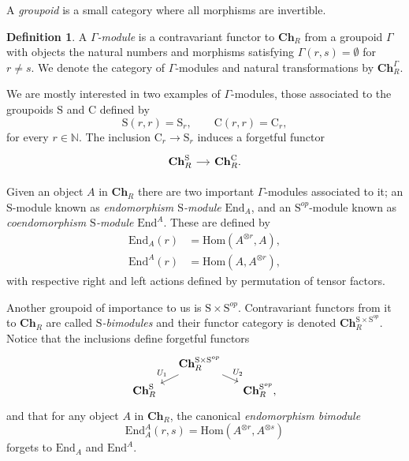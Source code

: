 \documentclass[A4]{amsart}
\theoremstyle{definition}
\newtheorem{definition}[theorem]{Definition}
\newcommand{\Hom}{\mathrm{Hom}}
\newcommand{\End}{\mathrm{End}}
\begin{document}
A \textit{groupoid} is a small category where all morphisms are invertible.
\begin{definition}
	A \textit{$\Gamma$-module} is a contravariant functor to $\mathbf{Ch}_R$ from a groupoid $\Gamma$ with objects the natural numbers and morphisms satisfying $\Gamma(r,s) = \emptyset$ for $r \neq s$. We denote the category of $\Gamma$-modules and natural transformations by $\mathbf{Ch}_R^\Gamma$.
\end{definition}

We are mostly interested in two examples of $\Gamma$-modules, those associated to the groupoids $\mathrm{S}$ and $\mathrm{C}$ defined by
\begin{equation*}
\mathrm{S}(r, r) = \mathrm{S}_r, \qquad
\mathrm{C}(r,r) = \mathrm{C}_r,
\end{equation*}
for every $r \in \mathbb{N}$. The inclusion $\mathrm{C}_r \to \mathrm{S}_r$ induces a forgetful functor
\begin{equation*}
\begin{tikzcd} [column sep = small]
\mathbf{Ch}_R^\mathrm{S}  \arrow[r] & \mathbf{Ch}_R^\mathrm{C}.
\end{tikzcd}
\end{equation*}

Given an object $A$ in $\mathbf{Ch}_R$ there are two important $\Gamma$-modules associated to it; an $\mathrm{S}$-module known as \textit{endomorphism $\mathrm{S}$-module} $\End_A$, and an $\mathrm{S}^{op}$-module known as \textit{coendomorphism $\mathrm{S}$-module} $\End^A$. These are defined by
\begin{align*}	
\End_A(r) &= \Hom(A^{\otimes r},A), \\
\End^A(r) &= \Hom(A,A^{\otimes r}),
\end{align*}
with respective right and left actions defined by permutation of tensor factors. 

Another groupoid of importance to us is $\mathrm{S} \times \mathrm{S}^{op}$. Contravariant functors from it to $\mathbf{Ch}_R$ are called \textit{$\mathrm{S}$-bimodules} and their functor category is denoted $\mathbf{Ch}_R^{\mathrm{S} \times \mathrm{S}^{op}}$. Notice that the inclusions
define forgetful functors
\begin{equation*}
\begin{tikzcd}[column sep=small, row sep=tiny]
& \mathbf{Ch}_R^{\mathrm{S} \times \mathrm{S}^{op}} \arrow[dl, "U_1"'] \arrow[dr, "U_2"] & \\
\mathbf{Ch}_R^{\mathrm{S}} &  & \mathbf{Ch}_R^{\mathrm{S}^{op}},
\end{tikzcd}
\end{equation*}
and that for any object $A$ in $\mathbf{Ch}_R$, the canonical \textit{endomorphism bimodule}
\begin{equation*}
\End_A^A(r, s) = \Hom(A^{\otimes r}, A^{\otimes s})
\end{equation*}
forgets to $\End_A$ and $\End^A$.
\end{document}
